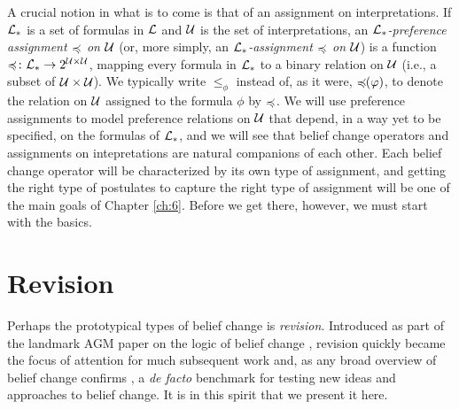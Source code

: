 A crucial notion in what is to come is that of an assignment on interpretations.
If $\mathcal{L}_{\ast}$ is a set of formulas in $\mathcal{L}$
and $\mathcal{U}$ is the set of interpretations, 
an \emph{$\mathcal{L}_{\ast}$-preference assignment $\preccurlyeq$ on $\mathcal{U}$}
(or, more simply, an \emph{$\mathcal{L}_{\ast}$-assignment $\preccurlyeq$ on $\mathcal{U}$})
is a function $\preccurlyeq\colon \mathcal{L}_{\ast}\rightarrow 2^{\mathcal{U}\times \mathcal{U}}$, 
mapping every formula in $\mathcal{L}_{\ast}$ to a binary relation on $\mathcal{U}$
(i.e., a subset of $\mathcal{U}\times \mathcal{U}$).
We typically write $\le_\phi$ instead of, as it were, ${\preccurlyeq\!\!(\varphi)}$, 
to denote the relation on $\mathcal{U}$ assigned to the formula $\phi$ by $\preccurlyeq$.
We will use preference assignments to model preference relations on $\mathcal{U}$ 
that depend, in a way yet to be specified, on the formulas of $\mathcal{L}_{\ast}$,
and we will see that belief change operators and assignments on intepretations 
are natural companions of each other.
Each belief change operator will be characterized by its own type of assignment,
and getting the right type of postulates to capture the right type of assignment
will be one of the main goals of Chapter \ref{ch:6}. Before we get there, however,
we must start with the basics.































\section{Revision}\label{sec:3-revision}
Perhaps the prototypical types of belief change is \emph{revision}.
Introduced as part of the landmark AGM paper on the logic of belief change
\cite{AlchourronGM85},
revision quickly became the focus of attention for much subsequent work
and, as any broad overview of belief change confirms
\cite{Gardenfors88,Hansson99a,Peppas08,Hansson17,FermeH18}, 
a \emph{de facto} benchmark for testing new ideas and approaches to belief change.
It is in this spirit that we present it here.

